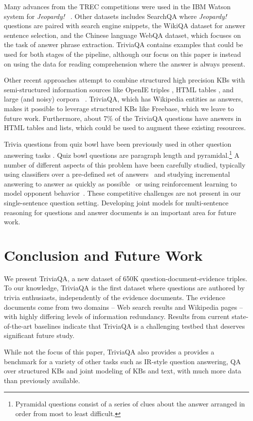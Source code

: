 Many advances from the TREC competitions were used in the IBM Watson system for \emph{Jeopardy!} ~\cite{Ferrucci:10}. Other datasets includes SearchQA \cite{searchqa} where \emph{Jeopardy!} questions are paired with search engine snippets, the WikiQA dataset \cite{WikiQA:16} for answer sentence selection, and the Chinese language WebQA \cite{LiLHWCZXWebQA16} dataset, which focuses on the task of answer phrase extraction. TriviaQA contains examples that could be used for both stages of the pipeline, although our focus on this paper is instead on using the data for reading comprehension where the answer is always present.

Other recent approaches attempt to combine structured high precision KBs with semi-structured information sources like OpenIE triples \cite{Fader14}, HTML tables \hbox{\cite{Pasupat2015CompositionalSP}}, and large (and noisy) corpora ~\cite{SawantC13,JoshiEMNLP2014,Xu:15}. TriviaQA, which has Wikipedia entities as answers, makes it possible to leverage structured KBs like Freebase, which we leave to future work. Furthermore, about 7\% of the TriviaQA questions have answers in HTML tables and lists, which could be used to augment these existing resources. 

Trivia questions from quiz bowl have been previously used in other question answering tasks \cite{boydgraber2012}.  Quiz bowl questions are paragraph length and pyramidal.\footnote{Pyramidal questions consist of a series of clues about the answer arranged in order from most to least difficult. } A number of different aspects of this problem have been carefully studied, typically using classifiers over a pre-defined set of answers~\cite{Iyyer:14} and studying incremental answering to answer as quickly as possible~\cite{boydgraber2012} or using reinforcement learning to model opponent behavior~\cite{he2016opponent}. These competitive challenges are not present in our single-sentence question setting. Developing joint models for multi-sentence reasoning for questions and answer documents is an important area for future work.

\section{Conclusion and Future Work} We present TriviaQA, a new dataset of 650K question-document-evidence triples. To our knowledge, TriviaQA is the first dataset where questions are authored by trivia enthusiasts, independently of the evidence documents. The evidence documents come from two domains -- Web search results and Wikipedia pages -- with highly  differing  levels  of  information  redundancy. Results from current state-of-the-art baselines indicate that TriviaQA is a challenging testbed that deserves significant future study.

While not the focus of this paper, TriviaQA also provides a provides a benchmark for a variety of other tasks such as IR-style question answering, QA over structured KBs and joint modeling of KBs and text, with much more data than previously available. 



